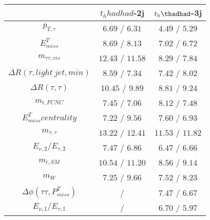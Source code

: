 \centering
\begin{tabular}{|c|c|c|} \hline
  & $t_h	hadhad$-2j & $t_h\thadhad$-3j \\\hline
$p_{T,\tau }$ & $6.69$ / $6.31$ & $4.49$ / $5.29$\\\hline
$E^{T}_{miss}$ & $8.69$ / $8.13$ & $7.02$ / $6.72$\\\hline
$m_{\tau \tau ,vis}$ & $12.43$ / $11.58$ & $8.29$ / $7.84$\\\hline
$\Delta R(\tau ,light~jet,min)$ & $8.59$ / $7.34$ & $7.42$ / $8.02$\\\hline
$\Delta R(\tau ,\tau )$ & $10.45$ / $9.89$ & $8.81$ / $9.24$\\\hline
$m_{t,FCNC}$ & $7.45$ / $7.06$ & $8.12$ / $7.48$\\\hline
$E^{T}_{miss} centrality$ & $7.22$ / $9.56$ & $7.60$ / $6.93$\\\hline
$m_{\tau ,\tau }$ & $13.22$ / $12.41$ & $11.53$ / $11.82$\\\hline
$E_{\nu,2}/E_{\tau ,2}$ & $7.47$ / $6.86$ & $6.47$ / $6.66$\\\hline
$m_{t,SM}$ & $10.54$ / $11.20$ & $8.56$ / $9.14$\\\hline
$m_{W}$ & $7.25$ / $9.66$ & $7.52$ / $8.23$\\\hline
$\Delta\phi(\tau \tau ,P^{T}_{miss})$ &  / & $7.47$ / $6.67$\\\hline
$E_{\nu,1}/E_{\tau ,1}$ &  / & $6.70$ / $5.97$\\\hline
\end{tabular}
